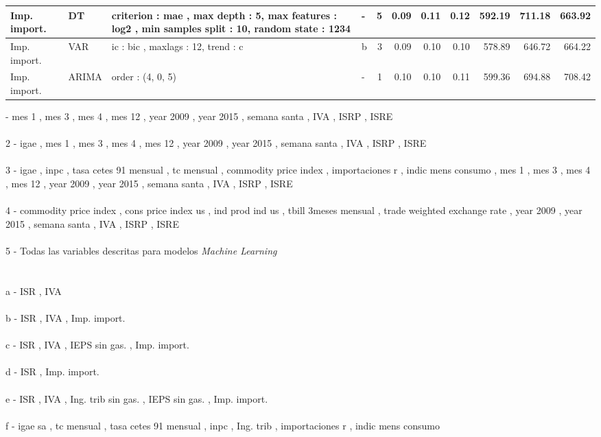 \documentclass[a4paper, 11pt]{article}
\begin{document}
\begin{landscape}
\begin{longtable}{p{5em}p{3.5em}p{13.165em}p{2.835em}rrrrrrr}
\hline
Imp. import. & DT    & criterion :  mae ,  max depth : 5,  max features :  log2 ,  min samples split : 10,  random state : 1234  & -     & 5     & 0.09  & 0.11  & 0.12  & 592.19 & 711.18 & 663.92 \\
\hline
Imp. import. & VAR   & ic :  bic ,  maxlags : 12,  trend :  c   & b     & 3     & 0.09  & 0.10  & 0.10  & 578.89 & 646.72 & 664.22 \\
\hline
Imp. import. & ARIMA & order : (4, 0, 5)  & -     & 1     & 0.10  & 0.10  & 0.11  & 599.36 & 694.88 & 708.42 \\
\hline\hline
\end{longtable}%

 -	  mes 1 ,  mes 3 ,  mes 4 ,  mes 12 ,  year 2009 ,  year 2015 ,  semana santa ,  IVA ,  ISRP ,  ISRE  \\\\
2 -	  igae ,  mes 1 ,  mes 3 ,  mes 4 ,  mes 12 ,  year 2009 ,  year 2015 ,  semana santa ,  IVA ,  ISRP ,  ISRE  \\\\
3 -	  igae ,  inpc ,  tasa cetes 91 mensual ,  tc mensual ,  commodity price index ,  importaciones r ,  indic mens consumo ,  mes 1 ,  mes 3 ,  mes 4 ,  mes 12 ,  year 2009 ,  year 2015 ,  semana santa ,  IVA ,  ISRP ,  ISRE  \\\\
4 -	  commodity price index ,  cons price index us ,  ind prod ind us ,  tbill 3meses mensual ,  trade weighted exchange rate ,  year 2009 ,  year 2015 ,  semana santa ,  IVA ,  ISRP ,  ISRE  \\\\
5 -	Todas las variables descritas para modelos \textit{Machine Learning} \\\\\\
a -	   ISR ,  IVA  \\\\
b -	   ISR ,  IVA ,  Imp. import.  \\\\
c -	   ISR ,  IVA ,  IEPS sin gas. ,  Imp. import.  \\\\
d -	   ISR ,  Imp. import.  \\\\
e -	   ISR ,  IVA ,   Ing. trib sin gas. ,  IEPS sin gas. ,  Imp. import.  \\\\
f -	  igae sa ,  tc mensual ,  tasa cetes 91 mensual ,  inpc ,   Ing. trib ,  importaciones r ,  indic mens consumo 

\end{landscape}
\end{document}
